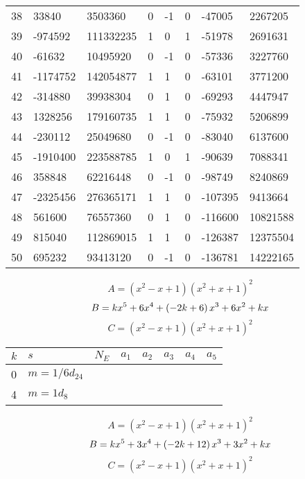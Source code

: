 \documentclass{amsart}
\begin{document}
\begin{longtable}{|l|l|l|lllll|}
38&33840&3503360&0&-1&0&-47005&2267205\\
39&-974592&111332235&1&0&1&-51978&2691631\\
40&-61632&10495920&0&-1&0&-57336&3227760\\
41&-1174752&142054877&1&1&0&-63101&3771200\\
42&-314880&39938304&0&1&0&-69293&4447947\\
43&1328256&179160735&1&1&0&-75932&5206899\\
44&-230112&25049680&0&-1&0&-83040&6137600\\
45&-1910400&223588785&1&0&1&-90639&7088341\\
46&358848&62216448&0&-1&0&-98749&8240869\\
47&-2325456&276365171&1&1&0&-107395&9413664\\
48&561600&76557360&0&1&0&-116600&10821588\\
49&815040&112869015&1&1&0&-126387&12375504\\
50&695232&93413120&0&-1&0&-136781&14222165\\
\hline
\end{longtable}
$$A=(x^2
 - x
 + 1)(x^2
 + x
 + 1)^{2}$$
$$B=k\*x^5
 + 6\*x^4
 + \left(-2\*k
 + 6\right) \*x^3
 + 6\*x^2
 + k\*x$$
$$C=(x^2
 - x
 + 1)(x^2
 + x
 + 1)^{2}$$
\begin{longtable}{|l|l|l|lllll|}
\hline
$k$ & $s$ & $N_E$ & $a_1$ & $a_2$ & $a_3$ & $a_4$ & $a_5$\\
\hline
0&$m=1/6d_{24}$&&\multicolumn{5}{c|}{}\\
4&$m=1d_{8}$&&\multicolumn{5}{c|}{}\\
\hline
\end{longtable}
$$A=(x^2
 - x
 + 1)(x^2
 + x
 + 1)^{2}$$
$$B=k\*x^5
 + 3\*x^4
 + \left(-2\*k
 + 12\right) \*x^3
 + 3\*x^2
 + k\*x$$
$$C=(x^2
 - x
 + 1)(x^2
 + x
 + 1)^{2}$$
\end{document}
